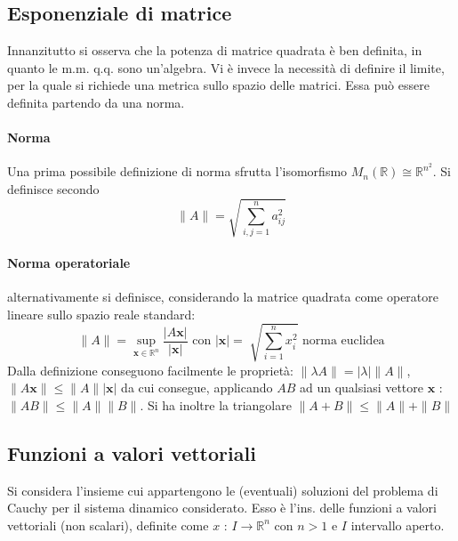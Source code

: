 \documentclass[10pt]{article}
\theoremstyle{plain}
\begin{document}
\subsection{Esponenziale di matrice}
Innanzitutto si osserva che la potenza di matrice quadrata è ben definita, in quanto le m.m. q.q. sono un'algebra. Vi è invece la necessità di definire il limite, per la quale si richiede una metrica sullo spazio delle matrici. Essa può essere definita partendo da una norma.
\paragraph{Norma}
Una prima possibile definizione di norma sfrutta l'isomorfismo $M_n(\mathbb{R}) \cong \mathbb{R}^{n^2}$. Si definisce secondo 
\[\|A\| = \sqrt{\sum \limits_{i,j = 1}^n a_{ij}^2}\]

\paragraph{Norma operatoriale} alternativamente si definisce, considerando la matrice quadrata come operatore lineare sullo spazio reale standard:
\[\|A\| = \sup\limits_{\displaystyle \mathbf{x} \in \mathbb{R}^n} \frac{|A\mathbf{x}|}{|\mathbf{x}|} \textrm{ con } |\mathbf{x}| = \sqrt[]{\sum\limits_{i=1}^n x_i^2} \textrm{ norma euclidea}\]
Dalla definizione conseguono facilmente le proprietà: $\displaystyle \|\lambda A\| = |\lambda| \|A\|$, $\displaystyle \|A \mathbf{x}\| \leq \|A\| |\mathbf{x}|$ da cui consegue, applicando $AB$ ad un qualsiasi vettore $\mathbf{x}$ : $\displaystyle \|AB\| \leq \|A\| \|B\|$. Si ha inoltre la triangolare $\displaystyle \|A + B\| \leq \|A\| + \|B\|$

\subsection{Funzioni a valori vettoriali}
Si considera l'insieme cui appartengono le (eventuali) soluzioni del problema di Cauchy per il sistema dinamico considerato. Esso è l'ins. delle funzioni a valori vettoriali (non scalari), definite come $\displaystyle x$ : $I \rightarrow \mathbb{R}^n$ con $n > 1$ e $I$ intervallo aperto.
\end{document}
